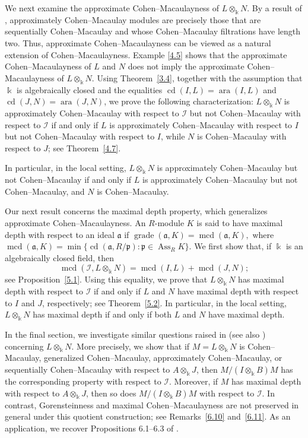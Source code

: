 \documentclass[10pt,a4paper]{amsart}
\numberwithin{equation}{theorem}
\theoremstyle{definition}
\theoremstyle{fact}
\theoremstyle{conjecture}
\newcommand{\Ass}{\operatorname{Ass}}
\newcommand{\grade}{\operatorname{grade}}
\newcommand{\ara}{\operatorname{ara}}
\newcommand{\cd}{\operatorname{cd}}
\newcommand{\mcd}{\operatorname{mcd}}
\begin{document}
We next examine the approximate Cohen--Macaulayness of $L\otimes_\Bbbk N$.
By a result of \cite{FR}, approximately
Cohen--Macaulay modules are precisely those that are sequentially
Cohen--Macaulay and whose Cohen--Macaulay filtrations have length
two. Thus, approximate Cohen--Macaulayness can be viewed as a
natural extension of Cohen--Macaulayness.
Example \ref{4.5} shows that the approximate Cohen--Macaulayness of $L$ and $N$ does
 not imply the approximate Cohen--Macaulayness of $L\otimes_\Bbbk N$. Using Theorem~\ref{3.4}, together with the assumption
that $\Bbbk$ is algebraically closed and the equalities
$\cd(I,L)=\ara(I,L)$ and $\cd(J,N)=\ara(J,N)$, we prove the
following characterization: $L\otimes_\Bbbk N$ is approximately
Cohen--Macaulay with respect to $\mathcal{I}$ but not
Cohen--Macaulay with respect to $\mathcal{I}$ if and only if
$L$ is approximately Cohen--Macaulay with respect to $I$ but not
Cohen--Macaulay with respect to $I$, while $N$ is
Cohen--Macaulay with respect to $J$; see Theorem~\ref{4.7}.

In particular, in the local setting, $L\otimes_\Bbbk N$ is
approximately Cohen--Macaulay but not Cohen--Macaulay if and only
if $L$ is approximately Cohen--Macaulay but not Cohen--Macaulay,
and $N$ is Cohen--Macaulay.


Our next result concerns the maximal depth property, which
generalizes approximate Cohen--Macaulayness. An $R$-module $K$ is
said to have maximal depth with respect to an ideal $\mathfrak{a}$
if
$
\grade(\mathfrak{a},K)=\mcd(\mathfrak{a},K),
$
where
$
\mcd(\mathfrak{a},K)
=\min\{\cd(\mathfrak{a},R/\mathfrak{p}):
\mathfrak{p}\in\Ass_R K\}.
$
We first show that, if $\Bbbk$ is an algebraically closed field, then
\[
\mcd(\mathcal{I},L\otimes_\Bbbk N)
=\mcd(I,L)+\mcd(J,N);
\]
see Proposition~\ref{5.1}. Using this equality, we prove that
$L\otimes_\Bbbk N$ has maximal depth with respect to $\mathcal{I}$
if and only if $L$ and $N$ have maximal depth with respect to $I$
and $J$, respectively; see Theorem~\ref{5.2}. In particular, in
the local setting, $L\otimes_\Bbbk N$ has maximal depth if and only
if both $L$ and $N$ have maximal depth.


In the final section, we investigate similar questions raised in \cite{R5} (see also \cite{NR})
 concerning $L\otimes_\Bbbk N$. More precisely, we show that if $M=L\otimes_\Bbbk N$ is Cohen--Macaulay,
  generalized Cohen--Macaulay, approximately Cohen--Macaulay, or sequentially Cohen--Macaulay with
   respect to $A\otimes_\Bbbk J$, then $M/(I\otimes_\Bbbk B)M$ has the corresponding property with
    respect to $\mathcal{I}$. Moreover, if $M$ has maximal depth with respect to $A\otimes_\Bbbk J$,
     then so does $M/(I\otimes_\Bbbk B)M$ with respect to $\mathcal{I}$. In contrast, Gorensteinness
      and maximal Cohen--Macaulayness are not preserved in general under this quotient construction; see Remarks~\ref{6.10} and~\ref{6.11}.
As an application, we recover Propositions 6.1--6.3 of \cite{R5}.
\end{document}
